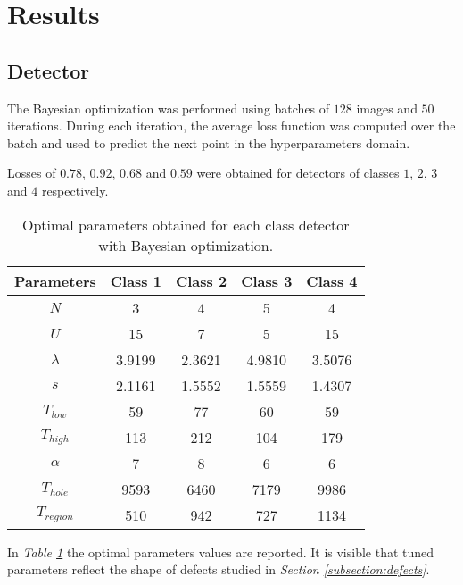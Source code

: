 \section{Results}\label{section:results}
    \subsection{Detector}
    \par{
    	The Bayesian optimization was performed using batches of $128$ images and $50$ iterations. During each iteration, the average loss function was computed over the batch and used to predict the next point in the hyperparameters domain.
    }	
   	\par{
    	Losses of $0.78$, $0.92$, $0.68$ and $0.59$ were obtained for detectors of classes $1$, $2$, $3$ and $4$ respectively.
    }
    \begin{table}
		\centering
		\begin{tabular}{|c|c|c|c|c|}
			\hline
			\textbf{Parameters} & \textbf{Class 1} & \textbf{Class 2} & \textbf{Class 3} & \textbf{Class 4}\\ \hline
			$N$ & 3 & 4 & 5 & 4 \\ \hline
			$U$ & 15 & 7 & 5 & 15 \\ \hline
			$\lambda$ & 3.9199 & 2.3621 & 4.9810 & 3.5076 \\ \hline
			$s$ & 2.1161 & 1.5552 & 1.5559 & 1.4307 \\ \hline
			$T_{low}$ & 59 & 77 & 60 & 59 \\ \hline
			$T_{high}$ & 113 & 212 & 104 & 179 \\ \hline
			$\alpha$ & 7 & 8 & 6 & 6 \\ \hline
			$T_{hole}$ & 9593 & 6460 & 7179 & 9986 \\ \hline
			$T_{region}$ & 510 & 942 & 727 & 1134 \\ \hline
		\end{tabular}
		\vspace{0.25cm}
		\caption{Optimal parameters obtained for each class detector with Bayesian optimization.}
		\label{table:params-bayesopt}
	\end{table}
	\par{
		In \emph{Table \ref{table:params-bayesopt}} the optimal parameters values are reported. It is visible that tuned parameters reflect the shape of defects studied in \emph{Section \ref{subsection:defects}}.
	}	
